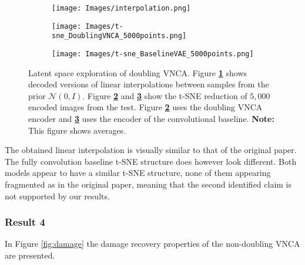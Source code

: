 \begin{figure}[ht]
    \begin{subfigure}{.46\textwidth}
        \centering
        \texttt{[image: Images/interpolation.png]}
        \caption{}
        \label{fig:interpolation}
    \end{subfigure}
    \begin{subfigure}{.24\textwidth}
        \centering
        \texttt{[image: Images/t-sne\_DoublingVNCA\_5000points.png]}
        \caption{}
        \label{fig:t-sne_DoublingVNCA}
    \end{subfigure}
    \begin{subfigure}{.26\textwidth}
        \centering
        \texttt{[image: Images/t-sne\_BaselineVAE\_5000points.png]}
        \caption{}
        \label{fig:t-sne_BaselineVAE}
    \end{subfigure}
    \caption{Latent space exploration of doubling VNCA. Figure \textbf{\ref{fig:interpolation}} shows decoded versions of linear interpolations between samples from the prior $\mathcal{N}(0, I)$. Figure \textbf{\ref{fig:t-sne_DoublingVNCA}} and \textbf{\ref{fig:t-sne_BaselineVAE}} show the t-SNE reduction of $5,000$ encoded images from the test. Figure \textbf{\ref{fig:t-sne_DoublingVNCA}} uses the doubling VNCA encoder and \textbf{\ref{fig:t-sne_BaselineVAE}} uses the encoder of the convolutional baseline. \textbf{Note:} This figure shows averages.}
    \label{fig:latent}
\end{figure}

The obtained linear interpolation is visually similar to that of the original paper. The fully convolution baseline t-SNE structure does however look different. Both models appear to have a similar t-SNE structure, none of them appearing fragmented as in the original paper, meaning that the second identified claim is not supported by our results.

\subsubsection{Result 4}

 In Figure \ref{fig:damage} the damage recovery properties of the non-doubling VNCA are presented. 

